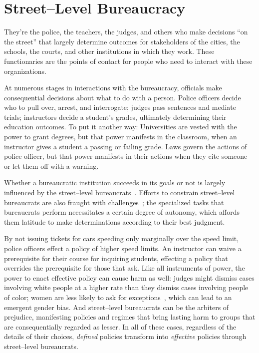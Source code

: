 \documentclass[street-level_algorithms]{subfiles}
\begin{document}
\section{Street--Level Bureaucracy}\label{sec:bureau}

They're the police, the teachers, the judges, and others who make decisions ``on the street''
that largely determine outcomes for stakeholders of
the cities, the schools, the courts, and other institutions in which they work.
These functionaries are the points of contact for people who need to interact with these organizations.

At numerous stages in interactions with the bureaucracy,
officials make consequential decisions about what to do with a person.
Police officers decide who to pull over, arrest, and interrogate;
judges pass sentences and mediate trials;
instructors decide a student's grades, ultimately determining their education outcomes.
To put it another way:
Universities are vested with the power to grant degrees, but
that power manifests in the classroom, when an instructor gives a student a passing or failing grade.
Laws govern the actions of police officer, but
that power manifests in their actions when they cite someone or let them off with a warning.

Whether a bureaucratic institution succeeds in its goals or not is
largely influenced by the street--level bureaucrats~\cite{wilson1989bureaucracy,hanf1982implementation}.
Efforts to constrain street--level bureaucrats are also fraught with challenges~\cite{huber2002deliberate};
the specialized tasks that bureaucrats perform necessitates a certain degree of autonomy, which
affords them latitude to make determinations according to their best judgment.

By not issuing tickets for cars speeding only marginally over the speed limit,
police officers effect a policy of higher speed limits.
An instructor can waive a prerequisite for their course for inquiring students,
effecting a policy that overrides the prerequisite for those that ask.
Like all instruments of power, the power to enact effective policy can cause harm as well:
judges might dismiss cases involving white people at a higher rate than they dismiss cases involving people of color;
women are less likely to ask for exceptions~\cite{babcock2009women},
which can lead to an emergent gender bias.
And street--level bureaucrats can be the arbiters of prejudice,
manifesting policies and regimes that bring lasting harm to groups that are consequentially regarded as lesser.
In all of these cases, regardless of the details of their choices,
\textit{defined} policies transform into \textit{effective} policies
through street--level bureaucrats.
\end{document}
